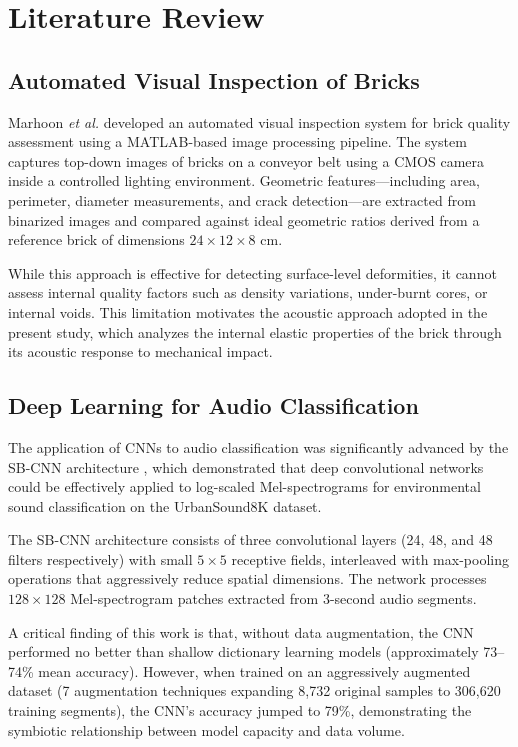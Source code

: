 \documentclass[12pt,a4paper,oneside]{report}
\begin{document}
\chapter{Literature Review}
\label{ch:literature}

\section{Automated Visual Inspection of Bricks}

Marhoon \textit{et al.} \cite{marhoon2015} developed an automated visual inspection system for brick quality assessment using a MATLAB-based image processing pipeline. The system captures top-down images of bricks on a conveyor belt using a CMOS camera inside a controlled lighting environment. Geometric features---including area, perimeter, diameter measurements, and crack detection---are extracted from binarized images and compared against ideal geometric ratios derived from a reference brick of dimensions \(24 \times 12 \times 8\) cm.

While this approach is effective for detecting surface-level deformities, it cannot assess internal quality factors such as density variations, under-burnt cores, or internal voids. This limitation motivates the acoustic approach adopted in the present study, which analyzes the internal elastic properties of the brick through its acoustic response to mechanical impact.

\section{Deep Learning for Audio Classification}

The application of CNNs to audio classification was significantly advanced by the SB-CNN architecture \cite{sbcnn2016}, which demonstrated that deep convolutional networks could be effectively applied to log-scaled Mel-spectrograms for environmental sound classification on the UrbanSound8K dataset.

The SB-CNN architecture consists of three convolutional layers (24, 48, and 48 filters respectively) with small \(5 \times 5\) receptive fields, interleaved with max-pooling operations that aggressively reduce spatial dimensions. The network processes \(128 \times 128\) Mel-spectrogram patches extracted from 3-second audio segments.

A critical finding of this work is that, without data augmentation, the CNN performed no better than shallow dictionary learning models (approximately 73--74\% mean accuracy). However, when trained on an aggressively augmented dataset (7 augmentation techniques expanding 8,732 original samples to 306,620 training segments), the CNN's accuracy jumped to 79\%, demonstrating the symbiotic relationship between model capacity and data volume.
\end{document}

